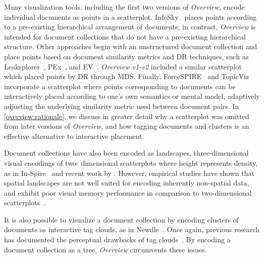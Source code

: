 Many visualization tools, including the first two versions of {\it Overview}, encode individual documents as points in a scatterplot. 
InfoSky~\cite{Granitzer2004} places points according to a pre-existing hierarchical arrangement of documents; in contrast, {\it Overview} is intended for document collections that do not have a pre-existing hierarchical structure. 
Other approaches begin with an unstructured document collection and place points based on document similarity metrics and \ac{DR} techniques, such as Leaksplorer~\cite{Leaksplorer}, PEx~\cite{Paulovich2007}, and EV~\cite{Chen2009}. 
{\it Overview v1-v2} included a similar scatterplot which placed points by \ac{DR} through \ac{MDS}.
Finally, ForceSPIRE~\cite{Endert2012b} and TopicViz~\cite{Eisenstein2012} incorporate a scatterplot where points corresponding to documents can be interactively placed according to one's own semantics or mental model, adaptively adjusting the underlying similarity metric used between document pairs.
In \autoref{overview:rationale}, we discuss in greater detail why a scatterplot was omitted from later versions of {\it Overview}, and how tagging documents and clusters is an effective alternative to interactive placement.

Document collections have also been encoded as landscapes, three-dimensional visual encodings of two- dimensional scatterplots where height represents density, as in In-Spire~\cite{Hetzler2004} and recent work by \citet{Oesterling2011}.
However, empirical studies have shown that spatial landscapes are not well suited for encoding inherently non-spatial data, and exhibit poor visual memory performance in comparison to two-dimensional scatterplots~\cite{Tory2009}.

It is also possible to visualize a document collection by encoding clusters of documents as interactive tag clouds, as in Newdle~\cite{Liu2013}.
Once again, previous research has documented the perceptual drawbacks of tag clouds~\cite{Hearst2008}.
By encoding a document collection as a tree, {\it Overview} circumvents these issues.

